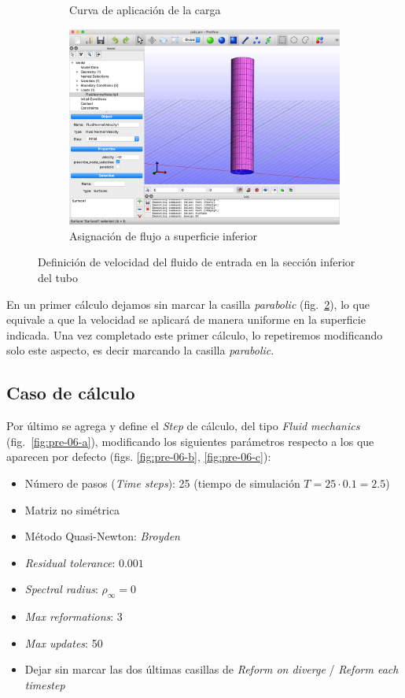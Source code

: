 \begin{figure}[!ht]
\begin{subfigure}[b]{0.35\textwidth}
\caption{Curva de aplicación de la carga}
\label{fig:pre-05-b}
\end{subfigure}
\hfil
\begin{subfigure}[b]{0.55\textwidth}
\includegraphics[width=\linewidth]{figuras_4/05_pre_load-fnv-2.png}
\caption{Asignación de flujo a superficie inferior}
\label{fig:pre-05-c}
\end{subfigure}
\caption{Definición de velocidad del fluido de entrada en la sección inferior del tubo}
\label{fig:pre-05}
\end{figure}
En un primer cálculo dejamos sin marcar la casilla \emph{parabolic} (fig.~\ref{fig:pre-05-c}), lo que equivale a que la velocidad se aplicará de manera uniforme en la superficie indicada.
Una vez completado este primer cálculo, lo repetiremos modificando solo este aspecto, es decir marcando la casilla \emph{parabolic}.

\subsection{Caso de cálculo}

Por último se agrega y define el \emph{Step} de cálculo, del tipo \emph{Fluid mechanics} (fig.~\ref{fig:pre-06-a}), modificando los siguientes parámetros respecto a los que aparecen por defecto (figs. \ref{fig:pre-06-b}, \ref{fig:pre-06-c}):
\begin{itemize}
	\item
	Número de pasos (\emph{Time steps}): 25 (tiempo de simulación $T=25\cdot 0.1=2.5$)
	\item
	Matriz no simétrica
	\item
	Método Quasi-Newton: \emph{Broyden}
	\item
	\emph{Residual tolerance}: $0.001$
	\item
	\emph{Spectral radius}: $\rho_{\infty}=0$
	\item
	\emph{Max reformations}: 3
	\item
	\emph{Max updates}: 50
	\item
	Dejar sin marcar las dos últimas casillas de \emph{Reform on diverge} / \emph{Reform each timestep}
\end{itemize}

